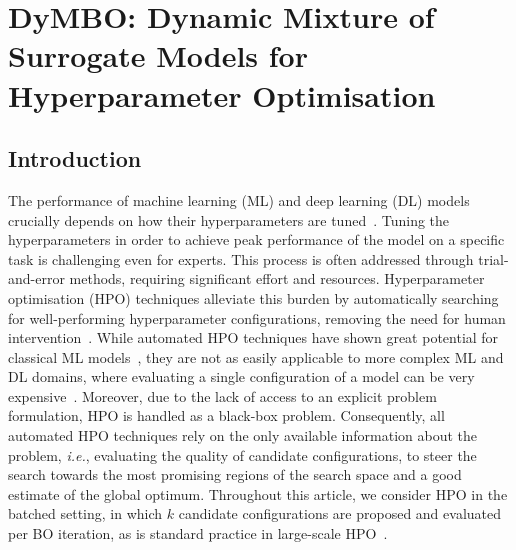 \chapter{DyMBO: Dynamic Mixture of Surrogate Models for Hyperparameter Optimisation}\label{ch:ch05:dymbo}



\section{Introduction}
\label{sec:ch05:intro}
The performance of machine learning (ML) and deep learning (DL) models crucially depends on how their hyperparameters are tuned~\citep{LavDav06,BisEtAl23}.
Tuning the hyperparameters in order to achieve peak performance of the model on  a specific task is challenging even for experts. 
This process is often addressed through trial-and-error methods, requiring significant effort and resources.
Hyperparameter optimisation (HPO) techniques alleviate this burden by automatically searching for well-performing hyperparameter configurations, removing the need for human intervention~\citep{SnoEtAl12}.
While automated HPO techniques have shown great potential for classical ML models~\citep{SnoEtAl12,FeuEtAl22}, they are not as easily applicable to more complex ML and DL domains, where evaluating a single configuration of a model can be very expensive~\citep{BroEtAl20}.
Moreover, due to the lack of access to an explicit problem formulation, HPO is handled as a black-box problem.
Consequently, all automated HPO techniques rely on the only available information about the problem, \emph{i.e.}, evaluating the quality of candidate configurations, to steer the search towards the most promising regions of the search space and a good estimate of the global optimum.
Throughout this article, we consider HPO in the batched setting, in which $k$ candidate configurations are proposed and evaluated per BO iteration, as is standard practice in large-scale HPO~\citep{CowEtAl22,BisEtAl23}.

